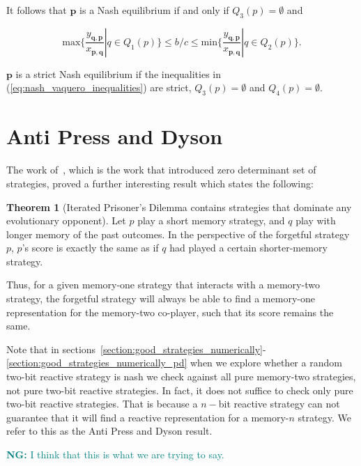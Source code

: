 \documentclass{article}
\theoremstyle{definition}
\newtheorem{theorem}{Theorem}[section]
\newcommand{\nikoleta}[1]{\textcolor{teal}{{\bf NG:} #1}}
\begin{document}
It follows that \(\mathbf{p}\) is a Nash equilibrium if and only if \(Q_3(p) = \emptyset\)
and

\begin{equation}\label{eq:nash_vaquero_inequalities}
  \text{max}\{ \frac{y_{\mathbf{q}, \mathbf{p}}}{x_{\mathbf{p}, \mathbf{q}}} | q \in Q_1(p) \} \leq b / c  \leq \text{min}\{\frac{y_{\mathbf{q}, \mathbf{p}}}{x_{\mathbf{p}, \mathbf{q}}} | q \in Q_2(p) \}.
\end{equation}

\(\mathbf{p}\) is a strict Nash equilibrium if the inequalities in
(\ref{eq:nash_vaquero_inequalities}) are strict, \(Q_3(p) = \emptyset\) and
\(Q_4(p) = \emptyset\).

\section{Anti Press and Dyson}

The work of~\citep{press:PNAS:2012}, which is the work that introduced
zero determinant set of strategies, proved a further interesting result which
states the following:

\begin{theorem}[Iterated Prisoner's Dilemma contains strategies that dominate any evolutionary opponent]
  Let \(p\) play a short memory strategy, and \(q\) play with longer memory of
  the past outcomes. In the perspective of the forgetful strategy \(p\), \(p\)'s
  score is exactly the same as if \(q\) had played a certain shorter-memory
  strategy.
\end{theorem}

Thus, for a given memory-one strategy that interacts with a memory-two strategy,
the forgetful strategy will always be able to find a memory-one representation
for the memory-two co-player, such that its score remains the same.

Note that in sections~\ref{section:good_strategies_numerically}-
\ref{section:good_strategies_numerically_pd} when we explore whether a random
two-bit reactive strategy is nash we check against all pure memory-two
strategies, not pure two-bit reactive strategies. In fact, it does not
suffice to check only pure two-bit reactive strategies.
That is because a \(n-\)bit reactive strategy can not guarantee that it will
find a reactive representation for a memory-\(n\) strategy. We refer to this
as the Anti Press and Dyson result.

\nikoleta{I think that this is what we are trying to say.}
\end{document}
